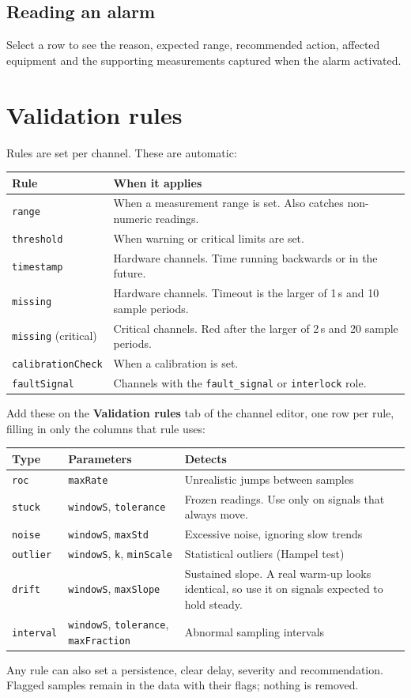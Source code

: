 \documentclass[11pt,a4paper]{article}
\newcommand{\ui}[1]{\textbf{#1}}
\newcommand{\key}[1]{\texttt{#1}}
\begin{document}
\subsection{Reading an alarm}
Select a row to see the reason, expected range, recommended action, affected equipment and the supporting
measurements captured when the alarm activated.

\section{Validation rules}
Rules are set per channel. These are automatic:
\begin{longtable}{@{}p{32mm}p{119mm}@{}}\toprule
Rule & When it applies\\\midrule\endhead
\key{range} & When a measurement range is set. Also catches non-numeric readings.\\
\key{threshold} & When warning or critical limits are set.\\
\key{timestamp} & Hardware channels. Time running backwards or in the future.\\
\key{missing} & Hardware channels. Timeout is the larger of 1\,s and 10 sample periods.\\
\key{missing} (critical) & Critical channels. Red after the larger of 2\,s and 20 sample periods.\\
\key{calibrationCheck} & When a calibration is set.\\
\key{faultSignal} & Channels with the \key{fault\_signal} or \key{interlock} role.\\\bottomrule
\end{longtable}
Add these on the \ui{Validation rules} tab of the channel editor, one row per rule, filling in only the columns that rule uses:
\begin{longtable}{@{}p{20mm}p{50mm}p{81mm}@{}}\toprule
Type & Parameters & Detects\\\midrule\endhead
\key{roc} & \key{maxRate} & Unrealistic jumps between samples\\
\key{stuck} & \key{windowS}, \key{tolerance} & Frozen readings. Use only on signals that always move.\\
\key{noise} & \key{windowS}, \key{maxStd} & Excessive noise, ignoring slow trends\\
\key{outlier} & \key{windowS}, \key{k}, \key{minScale} & Statistical outliers (Hampel test)\\
\key{drift} & \key{windowS}, \key{maxSlope} & Sustained slope. A real warm-up looks identical, so use it on signals expected to hold steady.\\
\key{interval} & \key{windowS}, \key{tolerance}, \key{maxFraction} & Abnormal sampling intervals\\\bottomrule
\end{longtable}
Any rule can also set a persistence, clear delay, severity and recommendation.
Flagged samples remain in the data with their flags; nothing is removed.
\end{document}
